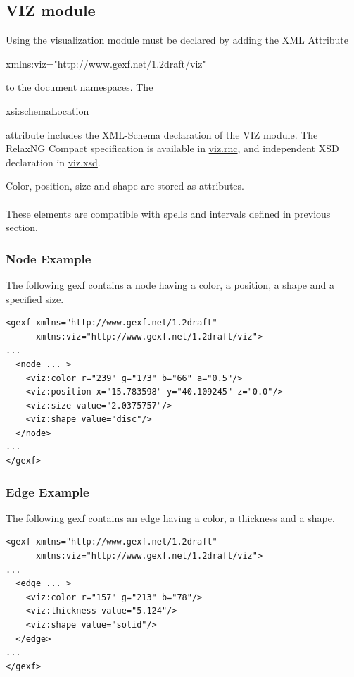 \documentclass[a4paper,10pt]{article}
\begin{document}
\subsection{VIZ module} \label{viz}

Using the visualization module must be declared by adding the XML Attribute \begin{footnotesize}xmlns:viz="http://www.gexf.net/1.2draft/viz"\end{footnotesize} to the document namespaces. The \begin{footnotesize}xsi:schemaLocation\end{footnotesize} attribute includes the XML-Schema declaration of the VIZ module. The RelaxNG Compact specification is available in \href{http://www.gexf.net/1.2draft/viz.rnc}{viz.rnc}, and independent XSD declaration in \href{http://www.gexf.net/1.2draft/viz.xsd}{viz.xsd}.

Color, position, size and shape are stored as attributes.

\paragraph{}
These elements are compatible with spells and intervals defined in previous section.

\subsubsection{Node Example}

The following gexf contains a node having a color, a position, a shape and a specified size.

\lstset{ style=gexf }
\begin{lstlisting}[caption={VIZ Attributes},label=vizattr]
<gexf xmlns="http://www.gexf.net/1.2draft"
      xmlns:viz="http://www.gexf.net/1.2draft/viz">
...
  <node ... >
    <viz:color r="239" g="173" b="66" a="0.5"/>
    <viz:position x="15.783598" y="40.109245" z="0.0"/>
    <viz:size value="2.0375757"/>
    <viz:shape value="disc"/>
  </node>
...
</gexf>
\end{lstlisting}

\subsubsection{Edge Example}

The following gexf contains an edge having a color, a thickness and a shape.

\lstset{ style=gexf }
\begin{lstlisting}[caption={VIZ Attributes},label=vizattr]
<gexf xmlns="http://www.gexf.net/1.2draft"
      xmlns:viz="http://www.gexf.net/1.2draft/viz">
...
  <edge ... >
    <viz:color r="157" g="213" b="78"/>
    <viz:thickness value="5.124"/>
    <viz:shape value="solid"/>
  </edge>
...
</gexf>
\end{lstlisting}
\end{document}
